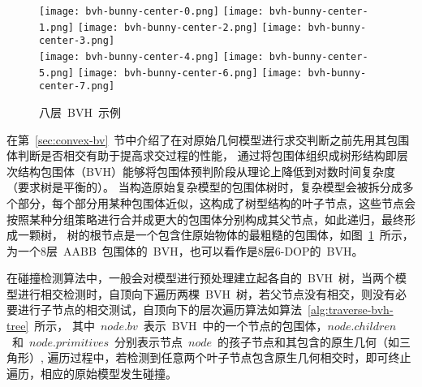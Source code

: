 \begin{figure}[htbp]
  \begin{center}
  \begin{boxedminipage}{0.87\textwidth}
  \subcaptionbox*{\label{lbl:bvh-bunny-center-0.png}}
    {\texttt{[image: bvh-bunny-center-0.png]}}
  \subcaptionbox*{\label{lbl:bvh-bunny-center-1.png}}
    {\texttt{[image: bvh-bunny-center-1.png]}}
  \subcaptionbox*{\label{lbl:bvh-bunny-center-2.png}}
    {\texttt{[image: bvh-bunny-center-2.png]}}
  \subcaptionbox*{\label{lbl:bvh-bunny-center-3.png}}
    {\texttt{[image: bvh-bunny-center-3.png]}}
    \vspace{-0.3cm}
  \\\hspace{0.5cm} 
  \subcaptionbox*{\label{lbl:bvh-bunny-center-4.png}}
    {\texttt{[image: bvh-bunny-center-4.png]}}
  \subcaptionbox*{\label{lbl:bvh-bunny-center-5.png}}
    {\texttt{[image: bvh-bunny-center-5.png]}}
  \subcaptionbox*{\label{lbl:bvh-bunny-center-6.png}}
    {\texttt{[image: bvh-bunny-center-6.png]}}
  \subcaptionbox*{\label{lbl:bvh-bunny-center-7.png}}
    {\texttt{[image: bvh-bunny-center-7.png]}}
  \vspace{-0.5cm}
  \end{boxedminipage}
\caption{八层~BVH~示例}
\label{lbl:bvh-example}
\end{center}
\end{figure}

在第~\ref{sec:convex-bv}~节中介绍了在对原始几何模型进行求交判断之前先用其包围体判断是否相交有助于提高求交过程的性能，
通过将包围体组织成树形结构即层次结构包围体（BVH）能够将包围体预判阶段从理论上降低到对数时间复杂度（要求树是平衡的）。
当构造原始复杂模型的包围体树时，复杂模型会被拆分成多个部分，每个部分用某种包围体近似，这构成了树型结构的叶子节点，这些节点会按照某种分组策略进行合并成更大的包围体分别构成其父节点，如此递归，最终形成一颗树，
树的根节点是一个包含住原始物体的最粗糙的包围体，如图~\ref{lbl:bvh-example}~所示，为一个8层~AABB~包围体的~BVH，也可以看作是8层6-DOP的~BVH。

在碰撞检测算法中，一般会对模型进行预处理建立起各自的~BVH~树，当两个模型进行相交检测时，自顶向下遍历两棵~BVH~树，若父节点没有相交，则没有必要进行子节点的相交测试，自顶向下的层次遍历算法如算法~\ref{alg:traverse-bvh-tree}~所示，
其中~$node.bv$~表示~BVH~中的一个节点的包围体，$node.children$~和~$node.primitives$~分别表示节点~$node$~的孩子节点和其包含的原生几何（如三角形）,
遍历过程中，若检测到任意两个叶子节点包含原生几何相交时，即可终止遍历，相应的原始模型发生碰撞。

